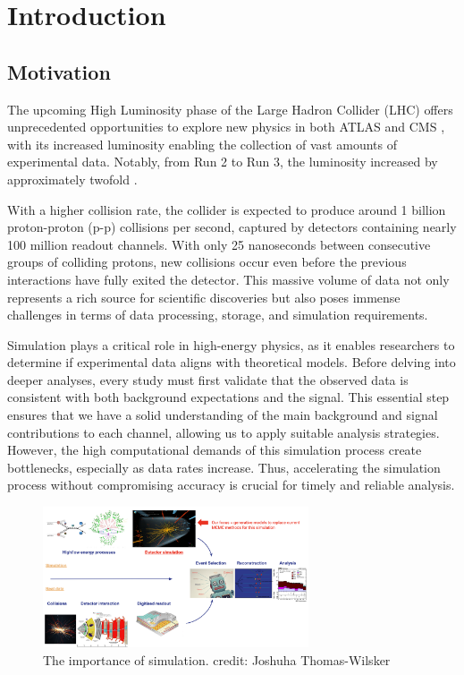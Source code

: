 
\chapter{Introduction}
\section{Motivation}

The upcoming High Luminosity phase of the Large Hadron Collider (LHC) \cite{LHC_machine_2008} offers unprecedented opportunities to explore new physics in both ATLAS \cite{collaboration_atlas_2008} and CMS \cite{CMS_2008}, with its increased luminosity enabling the collection of vast amounts of experimental data. Notably, from Run 2 to Run 3, the luminosity increased by approximately twofold \cite{Future_LHC}.

With a higher collision rate, the collider is expected to produce around 1 billion proton-proton (p-p) collisions per second, captured by detectors containing nearly 100 million readout channels. With only 25 nanoseconds between consecutive groups of colliding protons, new collisions occur even before the previous interactions have fully exited the detector. This massive volume of data not only represents a rich source for scientific discoveries but also poses immense challenges in terms of data processing, storage, and simulation requirements.

Simulation plays a critical role in high-energy physics, as it enables researchers to determine if experimental data aligns with theoretical models. Before delving into deeper analyses, every study must first validate that the observed data is consistent with both background expectations and the signal. This essential step ensures that we have a solid understanding of the main background and signal contributions to each channel, allowing us to apply suitable analysis strategies. However, the high computational demands of this simulation process create bottlenecks, especially as data rates increase. Thus, accelerating the simulation process without compromising accuracy is crucial for timely and reliable analysis.

\begin{figure}[H]
    \centering
    \includegraphics[width=0.7\textwidth]{Figures/simulation.png}
    \caption{The importance of simulation. credit: Joshuha Thomas-Wilsker}
    \label{fig:fig1}
\end{figure}


